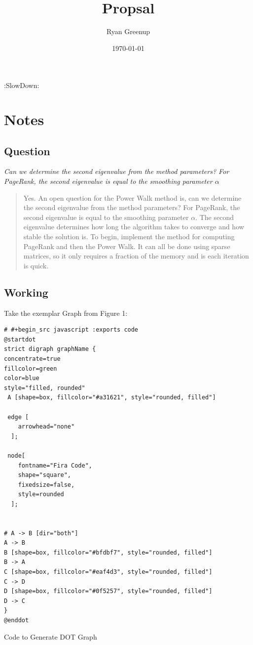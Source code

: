 \documentclass[11pt]{article}
\author{Ryan Greenup}
\date{\today}
\title{Propsal}
\begin{document}
\maketitle
\tableofcontents

:SlowDown:


\section{Notes}
\label{sec:org44c0716}

\subsection{Question}
\label{sec:orge366a61}

\emph{Can we determine the second eigenvalue from the method parameters? For PageRank, the second eigenvalue is equal to the smoothing parameter \(\alpha\)}

\begin{quote}
Yes. An open question for the Power Walk method is, can we determine the second eigenvalue from the method parameters? For PageRank, the second eigenvalue is equal to the smoothing parameter \(\alpha\). The second eigenvalue determines how long the algorithm takes to converge and how stable the solution is.
To begin, implement the method for computing PageRank and then the Power Walk. It can all be done using sparse matrices, so it only requires a fraction of the memory and is each iteration is quick.
\end{quote}

\subsection{Working}
\label{sec:orgedd20db}

Take the exemplar Graph from Figure 1:


\begin{listing}[htbp]
\begin{verbatim}
# #+begin_src javascript :exports code
@startdot
strict digraph graphName {
concentrate=true
fillcolor=green
color=blue
style="filled, rounded"
 A [shape=box, fillcolor="#a31621", style="rounded, filled"]

 edge [
    arrowhead="none"
  ];

 node[
    fontname="Fira Code",
    shape="square",
    fixedsize=false,
    style=rounded
  ];


# A -> B [dir="both"]
A -> B
B [shape=box, fillcolor="#bfdbf7", style="rounded, filled"]
B -> A
C [shape=box, fillcolor="#eaf4d3", style="rounded, filled"]
C -> D
D [shape=box, fillcolor="#0f5257", style="rounded, filled"]
D -> C
}
@enddot
\end{verbatim}
\caption{\label{org0a9f353}Code to Generate DOT Graph}
\end{listing}
\end{document}
